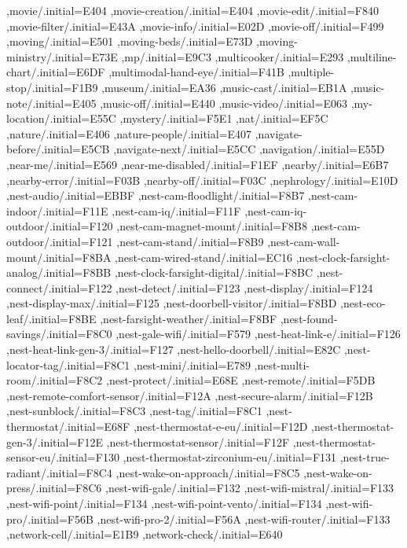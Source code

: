 { ,movie/.initial=E404
 ,movie-creation/.initial=E404
 ,movie-edit/.initial=F840
 ,movie-filter/.initial=E43A
 ,movie-info/.initial=E02D
 ,movie-off/.initial=F499
 ,moving/.initial=E501
 ,moving-beds/.initial=E73D
 ,moving-ministry/.initial=E73E
 ,mp/.initial=E9C3
 ,multicooker/.initial=E293
 ,multiline-chart/.initial=E6DF
 ,multimodal-hand-eye/.initial=F41B
 ,multiple-stop/.initial=F1B9
 ,museum/.initial=EA36
 ,music-cast/.initial=EB1A
 ,music-note/.initial=E405
 ,music-off/.initial=E440
 ,music-video/.initial=E063
 ,my-location/.initial=E55C
 ,mystery/.initial=F5E1
 ,nat/.initial=EF5C
 ,nature/.initial=E406
 ,nature-people/.initial=E407
 ,navigate-before/.initial=E5CB
 ,navigate-next/.initial=E5CC
 ,navigation/.initial=E55D
 ,near-me/.initial=E569
 ,near-me-disabled/.initial=F1EF
 ,nearby/.initial=E6B7
 ,nearby-error/.initial=F03B
 ,nearby-off/.initial=F03C
 ,nephrology/.initial=E10D
 ,nest-audio/.initial=EBBF
 ,nest-cam-floodlight/.initial=F8B7
 ,nest-cam-indoor/.initial=F11E
 ,nest-cam-iq/.initial=F11F
 ,nest-cam-iq-outdoor/.initial=F120
 ,nest-cam-magnet-mount/.initial=F8B8
 ,nest-cam-outdoor/.initial=F121
 ,nest-cam-stand/.initial=F8B9
 ,nest-cam-wall-mount/.initial=F8BA
 ,nest-cam-wired-stand/.initial=EC16
 ,nest-clock-farsight-analog/.initial=F8BB
 ,nest-clock-farsight-digital/.initial=F8BC
 ,nest-connect/.initial=F122
 ,nest-detect/.initial=F123
 ,nest-display/.initial=F124
 ,nest-display-max/.initial=F125
 ,nest-doorbell-visitor/.initial=F8BD
 ,nest-eco-leaf/.initial=F8BE
 ,nest-farsight-weather/.initial=F8BF
 ,nest-found-savings/.initial=F8C0
 ,nest-gale-wifi/.initial=F579
 ,nest-heat-link-e/.initial=F126
 ,nest-heat-link-gen-3/.initial=F127
 ,nest-hello-doorbell/.initial=E82C
 ,nest-locator-tag/.initial=F8C1
 ,nest-mini/.initial=E789
 ,nest-multi-room/.initial=F8C2
 ,nest-protect/.initial=E68E
 ,nest-remote/.initial=F5DB
 ,nest-remote-comfort-sensor/.initial=F12A
 ,nest-secure-alarm/.initial=F12B
 ,nest-sunblock/.initial=F8C3
 ,nest-tag/.initial=F8C1
 ,nest-thermostat/.initial=E68F
 ,nest-thermostat-e-eu/.initial=F12D
 ,nest-thermostat-gen-3/.initial=F12E
 ,nest-thermostat-sensor/.initial=F12F
 ,nest-thermostat-sensor-eu/.initial=F130
 ,nest-thermostat-zirconium-eu/.initial=F131
 ,nest-true-radiant/.initial=F8C4
 ,nest-wake-on-approach/.initial=F8C5
 ,nest-wake-on-press/.initial=F8C6
 ,nest-wifi-gale/.initial=F132
 ,nest-wifi-mistral/.initial=F133
 ,nest-wifi-point/.initial=F134
 ,nest-wifi-point-vento/.initial=F134
 ,nest-wifi-pro/.initial=F56B
 ,nest-wifi-pro-2/.initial=F56A
 ,nest-wifi-router/.initial=F133
 ,network-cell/.initial=E1B9
 ,network-check/.initial=E640
}

